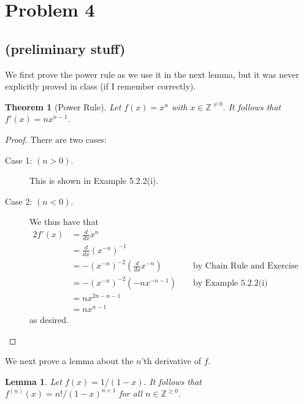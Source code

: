 \documentclass[10pt]{article}
\newtheorem{theorem}{Theorem}[]
\newtheorem{lemma}[]{Lemma}
\begin{document}
\newpage
\section*{Problem 4}

\subsection*{(preliminary stuff)}

We first prove the power rule as we use it in the next lemma, but it was never explicitly proved in class (if I remember correctly).
\begin{theorem}[Power Rule]
    Let $f(x)=x^n$ with $x\in\mathbb{Z}^{\neq0}.$ It follows that $f'(x)=nx^{n-1}.$
\end{theorem}
\begin{proof}
    There are two cases:
    \begin{description}
        \item[Case 1: $(n>0).$] This is shown in Example 5.2.2(i).  
        \item[Case 2: $(n<0).$]  We thus have that
        \begin{alignat*}{2}
            f'(x) &= \frac{d}{dx}x^n\\
            &=\frac{d}{dx}(x^{-n})^{-1}\\
            &= -(x^{-n})^{-2} \left ( \frac{d}{dx}x^{-n}\right ) \qquad&&\text{by Chain Rule and Exercise 5.2.3(a)}\\
            &= -(x^{-n})^{-2} (-nx^{-n-1}) &&\text{by Example 5.2.2(i)}\\
            &=nx^{2n-n-1}\\
            &= nx^{n-1}
        \end{alignat*}
        as desired.
    \end{description}
\end{proof}

\noindent
We next prove a lemma about the $n$'th derivative of $f$.

\begin{lemma} \label{lem:d}
    Let $f(x)=1/(1-x).$ It follows that $f^{(n)}(x)=n!/(1-x)^{n+1}$ for all $n\in\mathbb{Z}^{\ge 0}$.
\end{lemma}
\end{document}
